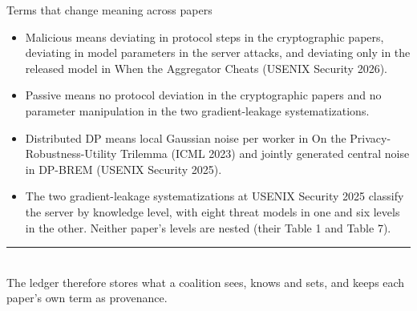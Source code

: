 \documentclass[aspectratio=169,10pt]{beamer}
\newcommand{\redline}{\textcolor{kred}{\rule{\textwidth}{1pt}}}
\begin{document}
\begin{frame}{Terms that change meaning across papers}
  \begin{itemize}
    \item Malicious means deviating in protocol steps in the cryptographic papers, deviating in model parameters in the server attacks, and deviating only in the released model in When the Aggregator Cheats (USENIX Security 2026).
    \item Passive means no protocol deviation in the cryptographic papers and no parameter manipulation in the two gradient-leakage systematizations.
    \item Distributed DP means local Gaussian noise per worker in On the Privacy-Robustness-Utility Trilemma (ICML 2023) and jointly generated central noise in DP-BREM (USENIX Security 2025).
    \item The two gradient-leakage systematizations at USENIX Security 2025 classify the server by knowledge level, with eight threat models in one and six levels in the other. Neither paper's levels are nested (their Table 1 and Table 7).
  \end{itemize}
  \vspace{0.6em}
  \redline\\[0.5em]
  The ledger therefore stores what a coalition sees, knows and sets, and keeps each paper's own term as provenance.
\end{frame}
\end{document}
